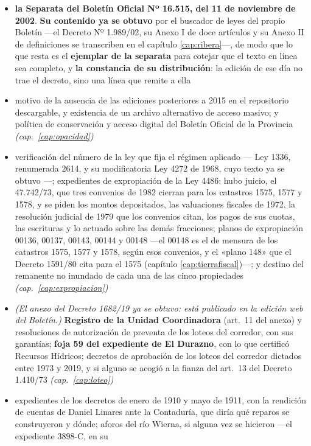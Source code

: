 \begin{itemize}[leftmargin=*]
\item \textbf{la Separata del Boletín Oficial Nº 16.515, del 11 de noviembre de 2002}. \textbf{Su contenido ya se obtuvo} por el buscador de leyes del propio Boletín ---el Decreto Nº 1.989/02, su Anexo I de doce artículos y su Anexo II de definiciones se transcriben en el capítulo \ref{cap:ribera}---, de modo que lo que resta es el \textbf{ejemplar de la separata} para cotejar que el texto en línea sea completo, y \textbf{la constancia de su distribución}: la edición de ese día no trae el decreto, sino una línea que remite a ella
\item motivo de la ausencia de las ediciones posteriores a 2015 en el repositorio descargable, y existencia de un archivo alternativo de acceso masivo; y política de conservación y acceso digital del Boletín Oficial de la Provincia \textit{(cap.\ \ref{cap:opacidad})}
\item verificación del número de la ley que fija el régimen aplicado --- Ley 1336, renumerada 2614, y su modificatoria Ley 4272 de 1968, cuyo texto ya se obtuvo ---; expedientes de expropiación de la Ley 4486: hubo juicio, el 47.742/73, que tres convenios de 1982 cierran para los catastros 1575, 1577 y 1578, y se piden los montos depositados, las valuaciones fiscales de 1972, la resolución judicial de 1979 que los convenios citan, los pagos de sus cuotas, las escrituras y lo actuado sobre las demás fracciones; planos de expropiación 00136, 00137, 00143, 00144 y 00148 ---el 00148 es el de mensura de los catastros 1575, 1577 y 1578, según esos convenios, y el «plano 148» que el Decreto 1591/80 cita para el 1575 (capítulo \ref{cap:tierrafiscal})---; y destino del remanente no inundado de cada una de las cinco propiedades \textit{(cap.\ \ref{cap:expropiacion})}
\item \textit{(El anexo del Decreto 1682/19 ya se obtuvo: está publicado en la edición web del Boletín.)} \textbf{Registro de la Unidad Coordinadora} (art.\ 11 del anexo) y resoluciones de autorización de preventa de los loteos del corredor, con sus garantías; \textbf{foja 59 del expediente de El Durazno}, con lo que certificó Recursos Hídricos; decretos de aprobación de los loteos del corredor dictados entre 1973 y 2019, y si alguno se acogió a la fianza del art.\ 13 del Decreto 1.410/73 \textit{(cap.\ \ref{cap:loteo})}
\item expedientes de los decretos de enero de 1910 y mayo de 1911, con la rendición de
cuentas de Daniel Linares ante la Contaduría, que diría qué reparos se construyeron y
dónde; aforos del río Wierna, si alguna vez se hicieron ---el expediente 3898-C, en su

\end{itemize}
